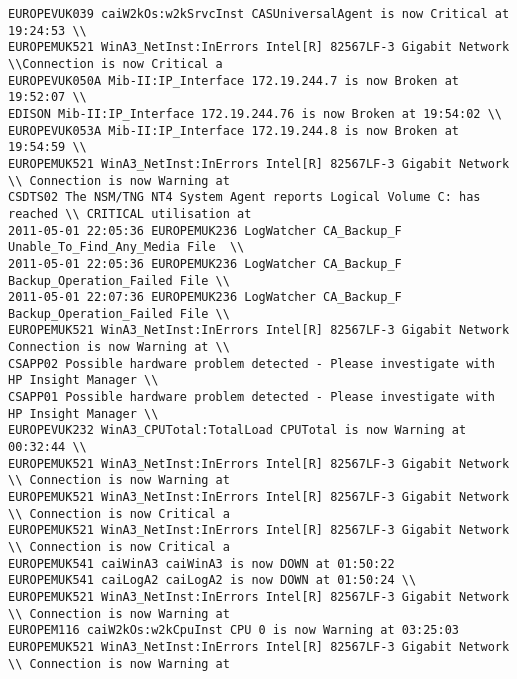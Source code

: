 \begin{lstlisting}
EUROPEVUK039 caiW2kOs:w2kSrvcInst CASUniversalAgent is now Critical at 19:24:53 \\
EUROPEMUK521 WinA3_NetInst:InErrors Intel[R] 82567LF-3 Gigabit Network \\Connection is now Critical a
EUROPEVUK050A Mib-II:IP_Interface 172.19.244.7 is now Broken at 19:52:07 \\
EDISON Mib-II:IP_Interface 172.19.244.76 is now Broken at 19:54:02 \\
EUROPEVUK053A Mib-II:IP_Interface 172.19.244.8 is now Broken at 19:54:59 \\
EUROPEMUK521 WinA3_NetInst:InErrors Intel[R] 82567LF-3 Gigabit Network \\ Connection is now Warning at
CSDTS02 The NSM/TNG NT4 System Agent reports Logical Volume C: has reached \\ CRITICAL utilisation at
2011-05-01 22:05:36 EUROPEMUK236 LogWatcher CA_Backup_F Unable_To_Find_Any_Media File  \\
2011-05-01 22:05:36 EUROPEMUK236 LogWatcher CA_Backup_F   Backup_Operation_Failed File \\
2011-05-01 22:07:36 EUROPEMUK236 LogWatcher CA_Backup_F Backup_Operation_Failed File \\
EUROPEMUK521 WinA3_NetInst:InErrors Intel[R] 82567LF-3 Gigabit Network Connection is now Warning at \\
CSAPP02 Possible hardware problem detected - Please investigate with HP Insight Manager \\
CSAPP01 Possible hardware problem detected - Please investigate with HP Insight Manager \\
EUROPEVUK232 WinA3_CPUTotal:TotalLoad CPUTotal is now Warning at 00:32:44 \\
EUROPEMUK521 WinA3_NetInst:InErrors Intel[R] 82567LF-3 Gigabit Network \\ Connection is now Warning at
EUROPEMUK521 WinA3_NetInst:InErrors Intel[R] 82567LF-3 Gigabit Network \\ Connection is now Critical a
EUROPEMUK521 WinA3_NetInst:InErrors Intel[R] 82567LF-3 Gigabit Network \\ Connection is now Critical a
EUROPEMUK541 caiWinA3 caiWinA3 is now DOWN at 01:50:22
EUROPEMUK541 caiLogA2 caiLogA2 is now DOWN at 01:50:24 \\
EUROPEMUK521 WinA3_NetInst:InErrors Intel[R] 82567LF-3 Gigabit Network \\ Connection is now Warning at
EUROPEM116 caiW2kOs:w2kCpuInst CPU 0 is now Warning at 03:25:03
EUROPEMUK521 WinA3_NetInst:InErrors Intel[R] 82567LF-3 Gigabit Network \\ Connection is now Warning at

\end{lstlisting}
